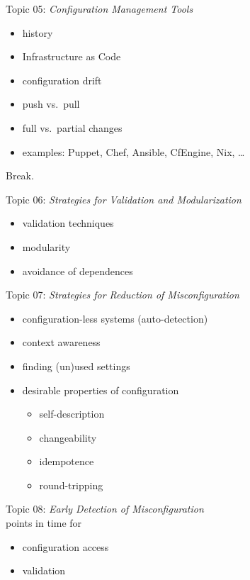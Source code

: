 \begin{frame}
	Topic 05: \textit{Configuration Management Tools}
	\begin{itemize}
		\item history
		\item Infrastructure as Code
		\item configuration drift
		\item push vs.\ pull
		\item full vs.\ partial changes
		\item examples: Puppet, Chef, Ansible, CfEngine, Nix, \dots
	\end{itemize}
\end{frame}

\begin{assignment}
	\begin{task}
	Break.
	\end{task}
\end{assignment}

\begin{frame}
	Topic 06: \textit{Strategies for Validation and Modularization}
	\begin{itemize}
		\item validation techniques
		\item modularity
		\item avoidance of dependences
	\end{itemize}
\end{frame}

\begin{frame}
	Topic 07: \textit{Strategies for Reduction of Misconfiguration}
	\begin{itemize}
		\item configuration-less systems (auto-detection)
		\item context awareness
		\item finding (un)used settings
		\item desirable properties of configuration
		\begin{itemize}
			\item self-description
			\item changeability
			\item idempotence
			\item round-tripping
		\end{itemize}
	\end{itemize}
\end{frame}

\begin{frame}
	Topic 08: \textit{Early Detection of Misconfiguration}
	\\ \vspace{1cm}
	points in time for
	\begin{itemize}
		\item configuration access
		\item validation
	\end{itemize}
\end{frame}

